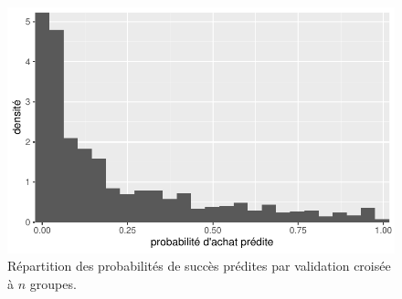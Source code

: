 \documentclass[
  11pt,
  letterpaper,
]{scrbook}
\theoremstyle{definition}
\theoremstyle{remark}
\begin{document}
\begin{figure}[ht!]

{\centering \includegraphics{reglogistique_files/figure-pdf/fig-classification0-1.pdf}

}

\caption{\label{fig-classification0}Répartition des probabilités de
succès prédites par validation croisée à \(n\) groupes.}

\end{figure}
\end{document}
